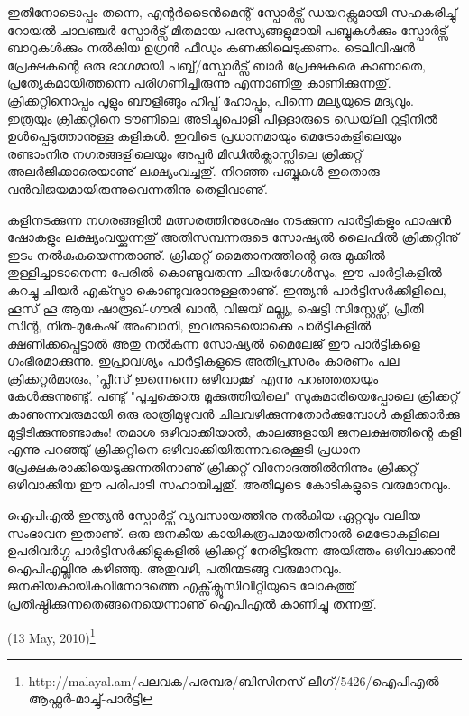 ഇതിനോടൊപ്പം തന്നെ, എന്റര്‍ടൈന്‍മെന്റ് സ്പോര്‍ട്സ് ഡയറക്റ്റുമായി സഹകരിച്ചു് റോയല്‍ ചാലഞ്ചര്‍ സ്പോര്‍ട്സ് 
മിതമായ പരസ്യങ്ങളുമായി പബ്ബുകള്‍ക്കും സ്പോര്‍ട്സ് ബാറുകള്‍ക്കും നല്‍കിയ ഉഗ്രന്‍ ഫീഡും കണക്കിലെടുക്കണം. 
ടെലിവിഷന്‍ പ്രേക്ഷകന്റെ ഒരു ഭാഗമായി പബ്ബ്/സ്പോര്‍ട്സ് ബാര്‍ പ്രേക്ഷകരെ കാണാതെ, പ്രത്യേകമായിത്തന്നെ 
പരിഗണിച്ചിരുന്നു എന്നാണിതു കാണിക്കുന്നതു്. ക്രിക്കറ്റിനൊപ്പം പൂളും ബൗളിങ്ങും ഹിപ്പ് ഹോപ്പും, പിന്നെ മല്യയുടെ മദ്യവും. 
ഇത്രയും ക്രിക്കറ്റിനെ ടൗണിലെ അടിച്ചുപൊളി പിള്ളാരുടെ ഡെയ്‌ലി റുട്ടീനില്‍ ഉള്‍പ്പെടുത്താനുള്ള കളികള്‍. ഇവിടെ 
പ്രധാനമായും മെട്രോകളിലെയും രണ്ടാംനിര നഗരങ്ങളിലെയും അപ്പര്‍ മിഡില്‍ക്ലാസ്സിലെ ക്രിക്കറ്റ് അലര്‍ജിക്കാരെയാണു് 
ലക്ഷ്യംവച്ചതു്. നിറഞ്ഞ പബ്ബുകള്‍ ഇതൊരു വന്‍വിജയമായിരുന്നുവെന്നതിനു തെളിവാണു്.


കളിനടക്കുന്ന നഗരങ്ങളില്‍ മത്സരത്തിനുശേഷം നടക്കുന്ന പാര്‍ട്ടികളും ഫാഷന്‍ ഷോകളും ലക്ഷ്യംവയ്ക്കുന്നതു് അതിസമ്പന്നരുടെ 
സോഷ്യല്‍ ലൈഫില്‍ ക്രിക്കറ്റിനു് ഇടം നല്‍കുകയെന്നതാണു്. ക്രിക്കറ്റ് മൈതാനത്തിന്റെ ഒരു മുക്കില്‍ 
തുള്ളിച്ചാടാനെന്ന പേരില്‍ കൊണ്ടുവരുന്ന ചിയര്‍ഗേള്‍സും, ഈ പാര്‍ട്ടികളില്‍ കുറച്ചു ചിയര്‍ എക്സ്ട്രാ കൊണ്ടുവരാനുള്ളതാണു്. 
ഇന്ത്യന്‍ പാര്‍ട്ടിസര്‍ക്കിളിലെ, ഹൂസ് ഹൂ ആയ ഷാരൂഖ്-ഗൗരി ഖാന്‍, വിജയ് മല്ല്യ, ഷെട്ടി സിസ്റ്റേഴ്സ്, പ്രീതി സിന്റ, 
നിത-മുകേഷ് അംബാനി, ഇവരുടെയൊക്കെ പാര്‍ട്ടികളില്‍ ക്ഷണിക്കപ്പെട്ടാല്‍ അതു നല്‍കുന്ന സോഷ്യല്‍ മൈലേജ് ഈ 
പാര്‍ട്ടികളെ ഗംഭീരമാക്കുന്നു. ഇപ്രാവശ്യം പാര്‍ട്ടികളുടെ അതിപ്രസരം കാരണം പല ക്രിക്കറ്റര്‍മാരും, 'പ്ലീസ് ഇന്നെന്നെ 
ഒഴിവാക്കൂ' എന്നു പറഞ്ഞതായും കേള്‍ക്കുന്നുണ്ടു്. പണ്ടു് "പൂച്ചക്കൊരു മൂക്കുത്തിയിലെ" സുകുമാരിയെപ്പോലെ ക്രിക്കറ്റ് 
കാണുന്നവരുമായി ഒരു രാത്രിമുഴുവന്‍ ചിലവഴിക്കുന്നതോര്‍ക്കുമ്പോള്‍ കളിക്കാര്‍ക്കു മുട്ടിടിക്കുന്നുണ്ടാകും! തമാശ ഒഴിവാക്കിയാല്‍, 
കാലങ്ങളായി ജനലക്ഷത്തിന്റെ കളി എന്നു പറഞ്ഞു് ക്രിക്കറ്റിനെ ഒഴിവാക്കിയിരുന്നവരെക്കൂടി പ്രധാന 
പ്രേക്ഷകരാക്കിയെടുക്കുന്നതിനാണു് ക്രിക്കറ്റ് വിനോദത്തില്‍നിന്നും ക്രിക്കറ്റ് ഒഴിവാക്കിയ ഈ പരിപാടി സഹായിച്ചതു്. 
അതിലൂടെ കോടികളുടെ വരുമാനവും.

ഐപിഎല്‍ ഇന്ത്യന്‍ സ്പോര്‍ട്സ് വ്യവസായത്തിനു നല്‍കിയ ഏറ്റവും വലിയ സംഭാവന ഇതാണു്. ഒരു ജനകീയ കായികരൂപമായതിനാല്‍ 
മെട്രോകളിലെ ഉപരിവര്‍ഗ്ഗ പാര്‍ട്ടിസര്‍ക്കിളുകളില്‍ ക്രിക്കറ്റ് നേരിട്ടിരുന്ന അയിത്തം ഒഴിവാക്കാന്‍ 
ഐപിഎല്ലിനു കഴിഞ്ഞു. അതുവഴി, പതിന്മടങ്ങു വരുമാനവും. ജനകീയകായികവിനോദത്തെ എക്സ്‌ക്ലൂസിവിറ്റിയുടെ ലോകത്തു് 
പ്രതിഷ്ഠിക്കുന്നതെങ്ങനെയെന്നാണു് ഐപിഎല്‍ കാണിച്ചു തന്നതു്.

\begin{flushright}(13 May, 2010)\footnote{http://malayal.am/പലവക/പരമ്പര/ബിസിനസ്-ലീഗ്/5426/ഐപിഎല്‍-ആഫ്റ്റര്‍-മാച്ചു്-പാര്‍ട്ടി}\end{flushright}

\newpage
